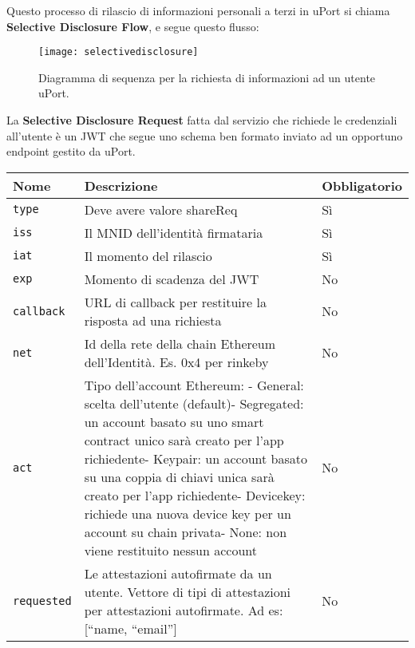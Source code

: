 Questo processo di rilascio di informazioni personali a terzi
in uPort si chiama \textbf{Selective Disclosure Flow}, e segue questo flusso:

\newpage

\begin{figure}[!ht]
    \texttt{[image: selectivedisclosure]}
    \caption{Diagramma di sequenza per la richiesta di informazioni ad un utente uPort.}
    \label{fig:selectivedisclosure}
\end{figure}

La \textbf{Selective Disclosure Request} fatta dal servizio che richiede le credenziali
all’utente è un JWT che segue uno schema ben formato inviato ad un
opportuno endpoint gestito da uPort. 

\begin{table}[htbp]
    \centering
      \begin{tabular}{p{6.165em}p{19.89em}p{6.335em}}
      \toprule
      \textbf{Nome} & \textbf{Descrizione} & \textbf{Obbligatorio} \\
      \midrule
      \texttt{type} & Deve avere valore shareReq & Sì \\
      \midrule
      \texttt{iss} & Il MNID dell’identità firmataria & Sì \\
      \midrule
      \texttt{iat} & Il momento del rilascio & Sì \\
      \midrule
      \texttt{exp} & Momento di scadenza del JWT & No \\
      \midrule
      \texttt{callback} & URL di callback per restituire la risposta ad una richiesta & No \\
      \midrule
      \texttt{net} & Id della rete della chain Ethereum dell’Identità. Es. 0x4 per rinkeby & No \\
      \midrule
      \texttt{act} & Tipo dell’account Ethereum: \newline{}- General: scelta dell’utente (default)\newline{}- Segregated: un account basato su uno smart contract unico sarà creato per l’app richiedente\newline{}- Keypair: un account basato su una coppia di chiavi unica sarà creato per l’app richiedente\newline{}- Devicekey: richiede una nuova device key per un account su chain privata\newline{}- None: non viene restituito nessun account & No \\
      \midrule
      \texttt{requested} & Le attestazioni autofirmate da un utente. Vettore di tipi di attestazioni\newline{} per attestazioni autofirmate. Ad es: [“name, “email”] & No \\

\end{tabular}
\end{table}

